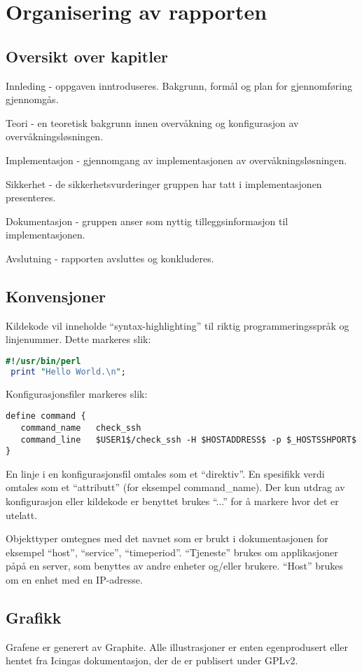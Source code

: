 \section{Organisering av rapporten}
\subsection{Oversikt over kapitler}
\begin{enumerate*}
\item Innleding - oppgaven inntroduseres. Bakgrunn, formål og plan for gjennomføring gjennomgås.
\item Teori - en teoretisk bakgrunn innen overvåkning og konfigurasjon av overvåkningsløsningen.
\item Implementasjon - gjennomgang av implementasjonen av overvåkningsløsningen.
\item Sikkerhet - de sikkerhetsvurderinger gruppen har tatt i implementasjonen presenteres.
\item Dokumentasjon - gruppen anser som nyttig tilleggsinformasjon til implementasjonen.
\item Avslutning - rapporten avsluttes og konkluderes.
\end{enumerate*}
\subsection{Konvensjoner}
Kildekode vil inneholde ``syntax-highlighting'' til riktig programmeringsspråk og linjenummer. Dette markeres slik:
\begin{lstlisting}[language=perl]
 #!/usr/bin/perl
 print "Hello World.\n";
\end{lstlisting}

Konfigurasjonsfiler markeres slik:
\begin{lstlisting}[style=example]
define command {
   command_name   check_ssh
   command_line   $USER1$/check_ssh -H $HOSTADDRESS$ -p $_HOSTSSHPORT$
}
\end{lstlisting}
En linje i en konfigurasjonsfil omtales som et ``direktiv''. En spesifikk verdi omtales som et ``attributt'' (for eksempel command\_name).
Der kun utdrag av konfigurasjon eller kildekode er benyttet brukes ``...'' for å markere hvor det er utelatt.

Objekttyper omtegnes med det navnet som er brukt i dokumentasjonen for eksempel ``host'', ``service'', ``timeperiod''. ``Tjeneste'' brukes om applikasjoner påpå en server, som benyttes av andre enheter og/eller brukere. ``Host'' brukes om en enhet med en IP-adresse. 
\subsection{Grafikk}
Grafene er generert av Graphite. Alle illustrasjoner er enten egenprodusert eller hentet fra Icingas dokumentasjon, der de er publisert under GPLv2.
